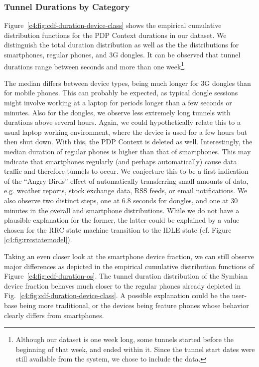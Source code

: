\subsubsection{Tunnel Durations by Category}

Figure~\ref{c4:fig:cdf-duration-device-class} shows the empirical cumulative distribution functions for the PDP Context durations in our dataset. We distinguish the total duration distribution as well as the the distributions for smartphones, regular phones, and 3G dongles. It can be observed that tunnel durations range between  seconds and more than one week\footnote{Although our dataset is one week long, some tunnels started before the beginning of that week, and ended within it. Since the tunnel start dates were still available from the system, we chose to include the data.}.

The median differs between device types, being much longer for 3G dongles than for mobile phones. This can probably be expected, as typical dongle sessions might involve working at a laptop for periods longer than a few seconds or minutes. Also for the dongles, we observe less extremely long tunnels with durations above several hours. Again, we could hypothetically relate this to a usual laptop working environment, where the device is used for a few hours but then shut down. With this, the PDP Context is deleted as well. Interestingly, the median duration of regular phones is higher than that of smartphones. This may indicate that  smartphones regularly (and perhaps automatically) cause data traffic and therefore tunnels to occur. We conjecture this to be a first indication of the ``Angry Birds'' effect of automatically transferring small amounts of data, e.g. weather reports, stock exchange data, RSS feeds, or email notifications. We also observe two distinct steps, one at 6.8 seconds for dongles, and one at 30 minutes in the overall and smartphone distributions. While we do not have a plausible explanation for the former, the latter could be explained by a value chosen for the RRC state machine transition to the IDLE state (cf. Figure \ref{c4:fig:rrcstatemodel}).




Taking an even closer look at the smartphone device fraction, we can still observe major differences as depicted in the empirical cumulative distribution functions of Figure~\ref{c4:fig:cdf-duration-os}. The tunnel duration distribution of the Symbian device fraction behaves much closer to the regular phones already depicted in Fig.~\ref{c4:fig:cdf-duration-device-class}. A possible explanation could be the user-base being more traditional, or the devices being feature phones whose behavior clearly differs from smartphones.

